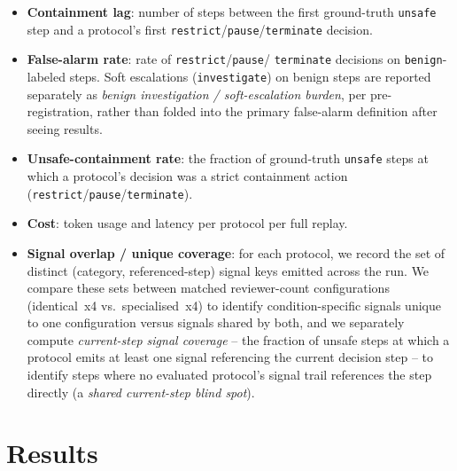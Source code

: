 \documentclass[11pt]{article}
\begin{document}
\begin{sloppypar}
\begin{itemize}
  \item \textbf{Containment lag}: number of steps between the first
        ground-truth \texttt{unsafe} step and a protocol's first
        \texttt{restrict}\slash\texttt{pause}\slash\texttt{terminate} decision.
  \item \textbf{False-alarm rate}: rate of \texttt{restrict}\slash\texttt{pause}/
        \texttt{terminate} decisions on \texttt{benign}-labeled steps. Soft
        escalations (\texttt{investigate}) on benign steps are reported
        separately as \emph{benign investigation / soft-escalation burden},
        per pre-registration, rather than folded into the primary false-alarm
        definition after seeing results.
  \item \textbf{Unsafe-containment rate}: the fraction of ground-truth
        \texttt{unsafe} steps at which a protocol's decision was a strict
        containment action (\texttt{restrict}\slash\texttt{pause}\slash\texttt{terminate}).
  \item \textbf{Cost}: token usage and latency per protocol per full replay.
  \item \textbf{Signal overlap / unique coverage}: for each protocol, we
        record the set of distinct (category, referenced-step) signal keys
        emitted across the run. We compare these sets between matched
        reviewer-count configurations (identical~x4 vs.\ specialised~x4) to
        identify condition-specific signals unique to one configuration
        versus signals shared by both, and we separately compute
        \emph{current-step signal coverage} -- the fraction of unsafe steps
        at which a protocol emits at least one signal referencing the
        current decision step -- to identify steps where no evaluated
        protocol's signal trail references the step directly (a
        \emph{shared current-step blind spot}).
\end{itemize}
\end{sloppypar}

\section{Results}
\label{sec:results}
\end{document}
